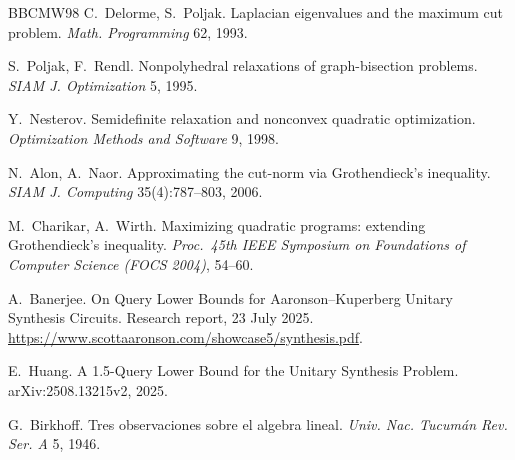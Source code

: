\documentclass[11pt,a4paper]{article}
\theoremstyle{plain}
\theoremstyle{definition}
\theoremstyle{remark}
\begin{document}
\begin{thebibliography}{BBCMW98}
 C.~Delorme, S.~Poljak. Laplacian eigenvalues and the maximum cut problem.
\emph{Math. Programming} 62, 1993.

 S.~Poljak, F.~Rendl. Nonpolyhedral relaxations of graph-bisection
problems. \emph{SIAM J. Optimization} 5, 1995.

 Y.~Nesterov. Semidefinite relaxation and nonconvex quadratic
optimization. \emph{Optimization Methods and Software} 9, 1998.

 N.~Alon, A.~Naor. Approximating the cut-norm via Grothendieck's
inequality. \emph{SIAM J. Computing} 35(4):787--803, 2006.

 M.~Charikar, A.~Wirth. Maximizing quadratic programs: extending
Grothen\-dieck's inequality. \emph{Proc.\ 45th IEEE Symposium on Foundations of Computer
Science (FOCS 2004)}, 54--60.

 A.~Banerjee. On Query Lower Bounds for Aaronson--Kuperberg
Unitary Synthesis Circuits. Research report, 23 July 2025.
\url{https://www.scottaaronson.com/showcase5/synthesis.pdf}.

 E.~Huang. A 1.5-Query Lower Bound for the Unitary Synthesis Problem.
arXiv:2508.13215v2, 2025.

 G.~Birkhoff. Tres observaciones sobre el algebra lineal. \emph{Univ.
Nac. Tucum\'an Rev. Ser. A} 5, 1946.

\end{thebibliography}
\end{document}
